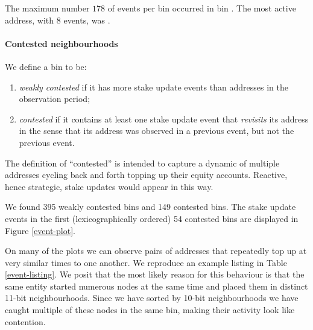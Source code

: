 The maximum number $178$ of events per bin occurred in bin .
%
The most active address, with $8$ events, was .

\paragraph{Contested neighbourhoods}
We define a bin to be:
\begin{enumerate}
  \item \emph{weakly contested} if it has more stake update events than addresses in the observation period;
  \item \emph{contested} if it contains at least one stake update event that \emph{revisits} its address in the sense that its address was observed in a previous event, but not the previous event.
\end{enumerate}
The definition of ``contested'' is intended to capture a dynamic of multiple addresses cycling back and forth topping up their equity accounts.
%
Reactive, hence strategic, stake updates would appear in this way.

We found 395 weakly contested bins and 149 contested bins. 
%
The stake update events in the first (lexicographically ordered) 54 contested bins are displayed in Figure \ref{event-plot}.

On many of the plots we can observe pairs of addresses that repeatedly top up at very similar times to one another.
%
We reproduce an example listing in Table \ref{event-listing}.
%
We posit that the most likely reason for this behaviour is that the same entity started numerous nodes at the same time and placed them in distinct 11-bit neighbourhoods.
%
Since we have sorted by 10-bit neighbourhoods we have caught multiple of these nodes in the same bin, making their activity look like contention.


